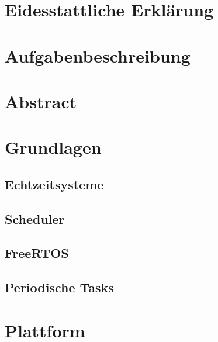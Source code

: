 \documentclass{scrartcl}
\begin{document}
\begin{titlepage}
		
	\end{titlepage}
	\clearpage 
	\section*{Eidesstattliche Erklärung}
		
		\clearpage
	\section*{Aufgabenbeschreibung}
		
		\clearpage
	\section*{Abstract}
		
		\clearpage
	\tableofcontents
		\clearpage
	\clearpage
	\section{Grundlagen}
		
		\subsection{Echtzeitsysteme}
			
		\subsection{Scheduler}
			
		\subsection{FreeRTOS}
			
		\subsection{Periodische Tasks}
			
		\clearpage
	\section{Plattform}
		
		\clearpage
\end{document}
